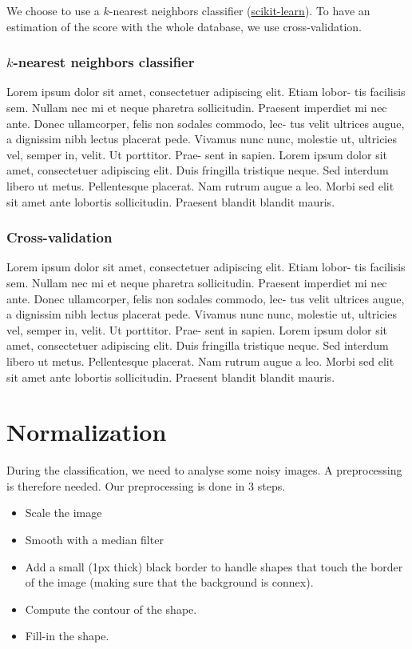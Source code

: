 \documentclass[a4paper, 11pt]{article}
\begin{document}
\noindent We choose to use a $k$-nearest neighbors classifier (\href{http://scikit-learn.org/stable/modules/generated/sklearn.neighbors.KNeighborsClassifier.html}{scikit-learn}).
To have an estimation of the score with the whole database, we use cross-validation.

\subsubsection{$k$-nearest neighbors classifier}

Lorem ipsum dolor sit amet, consectetuer adipiscing elit. Etiam lobor-
tis facilisis sem. Nullam nec mi et neque pharetra sollicitudin. Praesent
imperdiet mi nec ante. Donec ullamcorper, felis non sodales commodo, lec-
tus velit ultrices augue, a dignissim nibh lectus placerat pede. Vivamus
nunc nunc, molestie ut, ultricies vel, semper in, velit. Ut porttitor. Prae-
sent in sapien. Lorem ipsum dolor sit amet, consectetuer adipiscing elit.
Duis fringilla tristique neque. Sed interdum libero ut metus. Pellentesque
placerat. Nam rutrum augue a leo. Morbi sed elit sit amet ante lobortis
sollicitudin. Praesent blandit blandit mauris.

\subsubsection{Cross-validation}

Lorem ipsum dolor sit amet, consectetuer adipiscing elit. Etiam lobor-
tis facilisis sem. Nullam nec mi et neque pharetra sollicitudin. Praesent
imperdiet mi nec ante. Donec ullamcorper, felis non sodales commodo, lec-
tus velit ultrices augue, a dignissim nibh lectus placerat pede. Vivamus
nunc nunc, molestie ut, ultricies vel, semper in, velit. Ut porttitor. Prae-
sent in sapien. Lorem ipsum dolor sit amet, consectetuer adipiscing elit.
Duis fringilla tristique neque. Sed interdum libero ut metus. Pellentesque
placerat. Nam rutrum augue a leo. Morbi sed elit sit amet ante lobortis
sollicitudin. Praesent blandit blandit mauris.

\newpage
\section{Normalization}

During the classification, we need to analyse some noisy images. A preprocessing is therefore needed. Our preprocessing is done in 3 steps.
\begin{itemize}
  \item Scale the image
  \item Smooth with a median filter
	\item Add a small (1px thick) black border to handle shapes that touch the border of the image (making sure that the background is connex).
	\item Compute the contour of the shape.
	\item Fill-in the shape.
\end{itemize}
\end{document}
